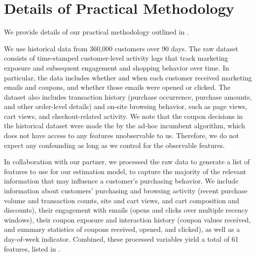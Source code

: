 \documentclass[format=acmsmall, review=false]{acmart}
\begin{document}
\section{Details of Practical Methodology} \label{sec:practicalMethodology}

We provide details of our practical methodology outlined in .

We use historical data from 360,000 customers over 90 days.
The raw dataset consists of time-stamped customer-level activity logs that track marketing exposure and subsequent engagement and shopping behavior over time. In particular, the data includes whether and when each customer received marketing emails and coupons, and whether those emails were opened or clicked. The dataset also includes transaction history (purchase occurrence, purchase amounts, and other order-level details) and on-site browsing behavior, such as page views, cart views, and checkout-related activity.
We note that the coupon decisions in the historical dataset were made the by the ad-hoc incumbent algorithm, which does not have access to any features unobservable to us.  Therefore, we do not expect any confounding as long as we control for the observable features.

In collaboration with our partner, we processed the raw data to generate a list of features to use for our estimation model, to capture the majority of the relevant information that may influence a customer's purchasing behavior.
We include information about customers’ 
purchasing and browsing activity (recent purchase volume and transaction counts, site and cart views, and cart composition and discounts), their engagement with emails (opens and clicks over multiple recency windows), their coupon exposure and interaction history (coupon values received, and summary statistics of coupons received, opened, and clicked), as well as a day-of-week indicator. 
Combined, these processed variables yield a total of 61 features, listed in . 
\end{document}
